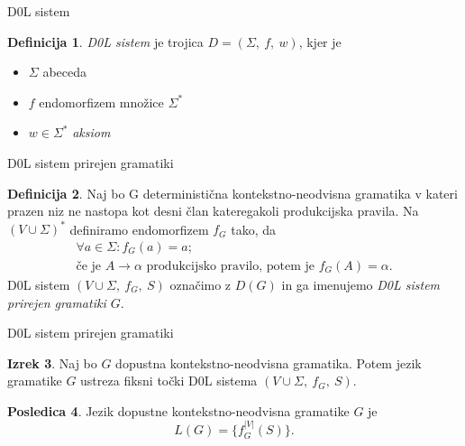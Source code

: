 \documentclass{beamer}
\theoremstyle{definition} %
\newtheorem{definicija}{Definicija}[section]
\newtheorem{izrek}[definicija]{Izrek}
\newtheorem{posledica}[definicija]{Posledica}
\begin{document}
\begin{frame}{D0L sistem}
    \begin{definicija}
        \textit{D0L sistem} je trojica $ D = (\Sigma, \ f, \ w) $, kjer je
        \begin{itemize}
            \item<2-> $ \Sigma $ abeceda
            \item<3-> $ f $ endomorfizem množice $ \Sigma^* $
            \item<4-> $ w \in \Sigma^* $ \textit{aksiom}
        \end{itemize}
        \pause
    \end{definicija}
\end{frame}

\begin{frame}{D0L sistem prirejen gramatiki}
    \begin{definicija}
        Naj bo G deterministična kontekstno-neodvisna gramatika v kateri prazen niz ne nastopa kot desni član kateregakoli
        produkcijska pravila. Na $ (V \cup \Sigma)^* $ definiramo endomorfizem $ f_G $ tako, da 
        \begin{gather*}
            \forall a \in \Sigma \colon f_G(a) = a; \\
            \text{če je } A \rightarrow \alpha \text{ produkcijsko pravilo, potem je } f_G(A) = \alpha.
        \end{gather*}
        \pause
        D0L sistem $ (V \cup \Sigma, \ f_G, \ S) $ označimo z $ D(G) $ in ga imenujemo \textit{D0L sistem prirejen gramatiki $G$}.
    \end{definicija}
\end{frame}

\begin{frame}{D0L sistem prirejen gramatiki}
    \begin{izrek}
        Naj bo $G$ dopustna kontekstno-neodvisna gramatika.
        Potem jezik gramatike $G$ ustreza fiksni točki D0L sistema $ (V \cup \Sigma, \ f_G, \ S) $.
    \end{izrek}
    \pause
    \begin{posledica}
        Jezik dopustne kontekstno-neodvisna gramatike $G$ je
        \[
            L(G) = \{f_G^{|V|}(S) \}.
        \]
    \end{posledica}
\end{frame}
\end{document}
